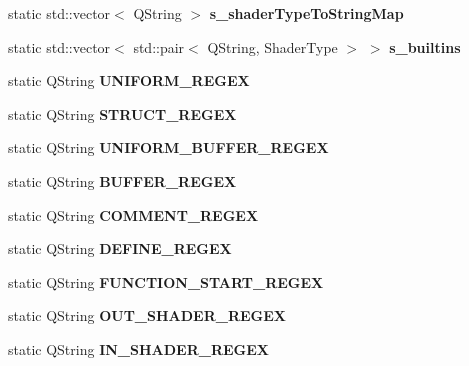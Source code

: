 \begin{DoxyCompactItemize}
static std\+::vector$<$ Q\+String $>$ {\bfseries s\+\_\+shader\+Type\+To\+String\+Map}
\item 
\mbox{\label{classrev_1_1_shader_abf65165dc03e9792d2be98b7db4be481}} 
static std\+::vector$<$ std\+::pair$<$ Q\+String, Shader\+Type $>$ $>$ {\bfseries s\+\_\+builtins}
\item 
\mbox{\label{classrev_1_1_shader_a4163e7b27bbf7760abe3a6b6480aa4db}} 
static Q\+String {\bfseries U\+N\+I\+F\+O\+R\+M\+\_\+\+R\+E\+G\+EX}
\item 
\mbox{\label{classrev_1_1_shader_aeab38a6a9053c116cfe408cf38a20a65}} 
static Q\+String {\bfseries S\+T\+R\+U\+C\+T\+\_\+\+R\+E\+G\+EX}
\item 
\mbox{\label{classrev_1_1_shader_a7e07599ef9d9dae4f33a044f2a46405f}} 
static Q\+String {\bfseries U\+N\+I\+F\+O\+R\+M\+\_\+\+B\+U\+F\+F\+E\+R\+\_\+\+R\+E\+G\+EX}
\item 
\mbox{\label{classrev_1_1_shader_a8499df56c19eb39c201959c8cb644da7}} 
static Q\+String {\bfseries B\+U\+F\+F\+E\+R\+\_\+\+R\+E\+G\+EX}
\item 
\mbox{\label{classrev_1_1_shader_a65032af47184eb7fe0423afee9dab03d}} 
static Q\+String {\bfseries C\+O\+M\+M\+E\+N\+T\+\_\+\+R\+E\+G\+EX}
\item 
\mbox{\label{classrev_1_1_shader_a0deb4da4ad76c9cb9200b99f4b059b86}} 
static Q\+String {\bfseries D\+E\+F\+I\+N\+E\+\_\+\+R\+E\+G\+EX}
\item 
\mbox{\label{classrev_1_1_shader_a23c70bb4ab0cf7382a1a029244f453e6}} 
static Q\+String {\bfseries F\+U\+N\+C\+T\+I\+O\+N\+\_\+\+S\+T\+A\+R\+T\+\_\+\+R\+E\+G\+EX}
\item 
\mbox{\label{classrev_1_1_shader_a5e3c2ac4fee00dc237a7d2dd38366fb4}} 
static Q\+String {\bfseries O\+U\+T\+\_\+\+S\+H\+A\+D\+E\+R\+\_\+\+R\+E\+G\+EX}
\item 
\mbox{\label{classrev_1_1_shader_a7cdfb6df7d4cd0ad024173362a9ca02b}} 
static Q\+String {\bfseries I\+N\+\_\+\+S\+H\+A\+D\+E\+R\+\_\+\+R\+E\+G\+EX}
\end{DoxyCompactItemize}
